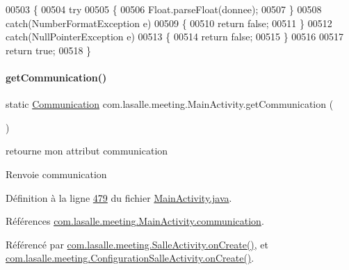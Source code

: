 \begin{DoxyCode}
00503     \{
00504         \textcolor{keywordflow}{try}
00505         \{
00506             Float.parseFloat(donnee);
00507         \}
00508         \textcolor{keywordflow}{catch}(NumberFormatException e)
00509         \{
00510             \textcolor{keywordflow}{return} \textcolor{keyword}{false};
00511         \}
00512         \textcolor{keywordflow}{catch}(NullPointerException e)
00513         \{
00514             \textcolor{keywordflow}{return} \textcolor{keyword}{false};
00515         \}
00516 
00517         \textcolor{keywordflow}{return} \textcolor{keyword}{true};
00518     \}
\end{DoxyCode}
\mbox{\label{classcom_1_1lasalle_1_1meeting_1_1_main_activity_a625741ceb02451098c8d7e6f95fafa3a}} 
\paragraph{\texorpdfstring{get\+Communication()}{getCommunication()}}
{\footnotesize\ttfamily static \hyperlink{classcom_1_1lasalle_1_1meeting_1_1_communication}{Communication} com.\+lasalle.\+meeting.\+Main\+Activity.\+get\+Communication (\begin{DoxyParamCaption}{ }\end{DoxyParamCaption})\hspace{0.3cm}{\ttfamily [static]}}



retourne mon attribut communication 

\begin{DoxyReturn}{Renvoie}
communication 
\end{DoxyReturn}


Définition à la ligne \hyperlink{_main_activity_8java_source_l00479}{479} du fichier \hyperlink{_main_activity_8java_source}{Main\+Activity.\+java}.



Références \hyperlink{_main_activity_8java_source_l00062}{com.\+lasalle.\+meeting.\+Main\+Activity.\+communication}.



Référencé par \hyperlink{_salle_activity_8java_source_l00060}{com.\+lasalle.\+meeting.\+Salle\+Activity.\+on\+Create()}, et \hyperlink{_configuration_salle_activity_8java_source_l00066}{com.\+lasalle.\+meeting.\+Configuration\+Salle\+Activity.\+on\+Create()}.


